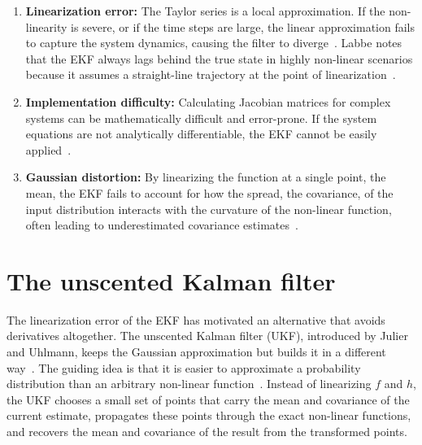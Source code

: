 \begin{enumerate}
    \item \textbf{Linearization error:} The Taylor series is a local approximation. If the non-linearity is severe, or if the time steps are large, the linear approximation fails to capture the system dynamics, causing the filter to diverge~\cite[Ch.~9]{labbe:kalman_and_bayesian_filters}. Labbe notes that the EKF always lags behind the true state in highly non-linear scenarios because it assumes a straight-line trajectory at the point of linearization~\cite[Ch.~8]{labbe:kalman_and_bayesian_filters}.
    \item \textbf{Implementation difficulty:} Calculating Jacobian matrices for complex systems can be mathematically difficult and error-prone. If the system equations are not analytically differentiable, the EKF cannot be easily applied~\cite[Ch.~11]{labbe:kalman_and_bayesian_filters}.
    \item \textbf{Gaussian distortion:} By linearizing the function at a single point, the mean, the EKF fails to account for how the spread, the covariance, of the input distribution interacts with the curvature of the non-linear function, often leading to underestimated covariance estimates~\cite[Ch.~5]{sarkka:bayesian_filtering}.
\end{enumerate}


\section{The unscented Kalman filter}

The linearization error of the EKF has motivated an alternative that avoids derivatives altogether. The unscented Kalman filter (UKF), introduced by Julier and Uhlmann, keeps the Gaussian approximation but builds it in a different way~\cite[Ch.~5]{sarkka:bayesian_filtering}. The guiding idea is that it is easier to approximate a probability distribution than an arbitrary non-linear function~\cite[Ch.~10]{labbe:kalman_and_bayesian_filters}. Instead of linearizing $f$ and $h$, the UKF chooses a small set of points that carry the mean and covariance of the current estimate, propagates these points through the exact non-linear functions, and recovers the mean and covariance of the result from the transformed points.


